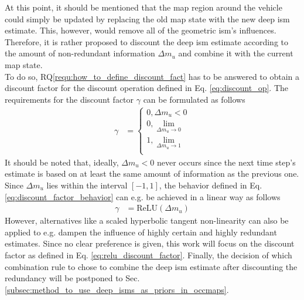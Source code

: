 At this point, it should be mentioned that the map region around the vehicle could simply be updated by replacing the old map state with the new deep \gls{ism} estimate. This, however, would remove all of the geometric \gls{ism}'s influences. Therefore, it is rather proposed to discount the deep \gls{ism} estimate according to the amount of non-redundant information $\Delta m_{u}$ and combine it with the current map state.\\
To do so, RQ\ref{requ:how_to_define_discount_fact} has to be answered to obtain a discount factor for the discount operation defined in Eq. \ref{eq:discount_op}. The requirements for the discount factor $\gamma$ can be formulated as follows
\begin{align}
	\label{eq:discount_factor_behavior}
	\gamma &= 
	\begin{cases}
		0, \Delta m_{u} < 0\\
		0, \lim\limits_{\Delta m_{u} \rightarrow 0}\\
		1, \lim\limits_{\Delta m_{u} \rightarrow 1}\\
	\end{cases}
\end{align}
It should be noted that, ideally, $\Delta m_{u} < 0$ never occurs since the next time step's estimate is based on at least the same amount of information as the previous one. Since $\Delta m_u$ lies within the interval $[-1,1]$, the behavior defined in Eq. \ref{eq:discount_factor_behavior} can e.g. be achieved in a linear way as follows
\begin{align}
	\label{eq:relu_discount_factor}
	\gamma &= \mathrm{ReLU}(\Delta m_u)
\end{align}
However, alternatives like a scaled hyperbolic tangent non-linearity can also be applied to e.g. dampen the influence of highly certain and highly redundant estimates. Since no clear preference is given, this work will focus on the discount factor as defined in Eq. \ref{eq:relu_discount_factor}. Finally, the decision of which combination rule to chose to combine the deep \gls{ism} estimate after discounting the redundancy will be postponed to Sec. \ref{subsec:method_to_use_deep_isms_as_priors_in_occmaps}.
%
